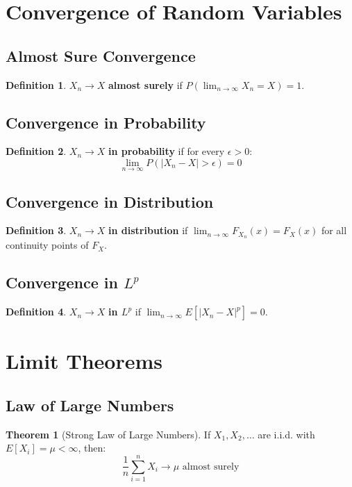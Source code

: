 \documentclass[11pt]{article}
\theoremstyle{definition}
\newtheorem{definition}{Definition}[section]
\newtheorem{theorem}{Theorem}[section]
\begin{document}
\section{Convergence of Random Variables}

\subsection{Almost Sure Convergence}
\begin{definition}
$X_n \to X$ \textbf{almost surely} if $P(\lim_{n \to \infty} X_n = X) = 1$.
\end{definition}

\subsection{Convergence in Probability}
\begin{definition}
$X_n \to X$ \textbf{in probability} if for every $\epsilon > 0$:
$$\lim_{n \to \infty} P(|X_n - X| > \epsilon) = 0$$
\end{definition}

\subsection{Convergence in Distribution}
\begin{definition}
$X_n \to X$ \textbf{in distribution} if $\lim_{n \to \infty} F_{X_n}(x) = F_X(x)$ for all continuity points of $F_X$.
\end{definition}

\subsection{Convergence in $L^p$}
\begin{definition}
$X_n \to X$ \textbf{in $L^p$} if $\lim_{n \to \infty} E[|X_n - X|^p] = 0$.
\end{definition}

\section{Limit Theorems}

\subsection{Law of Large Numbers}
\begin{theorem}[Strong Law of Large Numbers]
If $X_1, X_2, \ldots$ are i.i.d. with $E[X_i] = \mu < \infty$, then:
$$\frac{1}{n} \sum_{i=1}^n X_i \to \mu \text{ almost surely}$$
\end{theorem}
\end{document}
